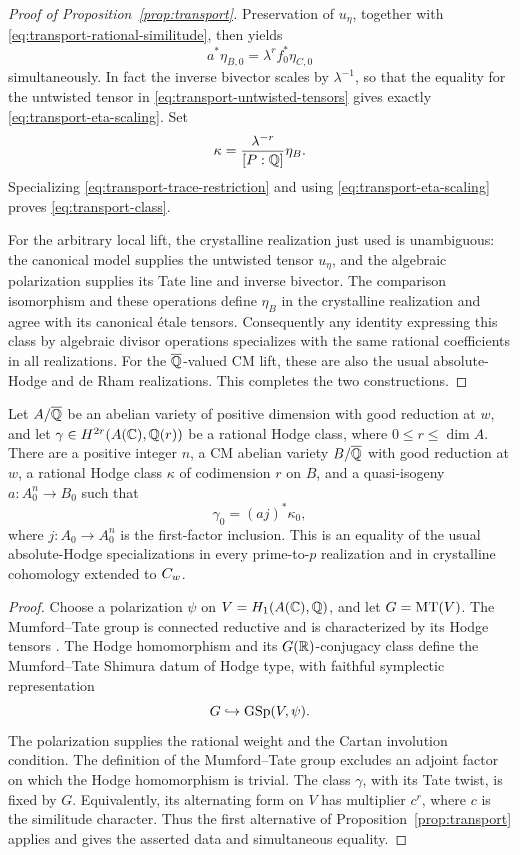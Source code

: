 \begin{proof}[Proof of Proposition~\ref{prop:transport}]
Preservation of $u_\eta$, together with
\eqref{eq:transport-rational-similitude}, then yields
\begin{equation}
 a^*\eta_{B,0}=\lambda^r f_0^*\eta_{C,0}
 \label{eq:transport-eta-scaling}
\end{equation}
simultaneously.  In fact the inverse bivector scales by
$\lambda^{-1}$, so that the equality for the untwisted tensor
in \eqref{eq:transport-untwisted-tensors} gives exactly
\eqref{eq:transport-eta-scaling}.  Set
\[
 \kappa=\frac{\lambda^{-r}}{[P:\mathbb Q]}\eta_B.
\]
Specializing \eqref{eq:transport-trace-restriction} and using
\eqref{eq:transport-eta-scaling} proves
\eqref{eq:transport-class}.

For the arbitrary local lift, the crystalline realization just
used is unambiguous: the canonical model supplies the untwisted
tensor $u_\eta$, and the algebraic polarization supplies its Tate
line and inverse bivector.  The comparison isomorphism and these
operations define $\eta_B$ in the crystalline realization and
agree with its canonical \'{e}tale tensors.  Consequently any
identity expressing this class by algebraic divisor operations
specializes with the same rational coefficients in all
realizations.  For the $\overline{\mathbb Q}$-valued CM lift, these are also the
usual absolute-Hodge and de Rham realizations.  This completes
the two constructions.
\end{proof}

\begin{corollary}
\label{cor:cm-transport}
Let \(A/\overline{\mathbb Q}\) be an abelian variety of positive dimension with
good reduction at \(w\), and let
\(\gamma\in H^{2r}(A(\mathbb C),\mathbb Q(r))\) be a rational Hodge class,
where \(0\leq r\leq\dim A\). There are a positive integer \(n\),
a CM abelian variety \(B/\overline{\mathbb Q}\) with good reduction at \(w\),
a rational Hodge class \(\kappa\) of codimension \(r\) on \(B\),
and a quasi-isogeny \(a:A_0^n\to B_0\) such that
\[
 \gamma_0=(aj)^*\kappa_0,
\]
where \(j:A_0\to A_0^n\) is the first-factor inclusion. This is an
equality of the usual absolute-Hodge specializations in every
prime-to-\(p\) realization and in crystalline cohomology extended
to \(C_w\).
\end{corollary}

\begin{proof}
Choose a polarization \(\psi\) on \(V=H_1(A(\mathbb C),\mathbb Q)\), and let
\(G=\operatorname{MT}(V)\). The Mumford--Tate group is connected reductive and
is characterized by its Hodge tensors
\cite[Section~3, Propositions~3.4 and~3.6]{Deligne1982}.
The Hodge homomorphism and its \(G(\mathbb R)\)-conjugacy class define
the Mumford--Tate Shimura datum of Hodge type, with faithful
symplectic representation
\[
 G\hookrightarrow\operatorname{GSp}(V,\psi).
\]
The polarization supplies the rational weight and the Cartan
involution condition. The definition of the Mumford--Tate group
excludes an adjoint factor on which the Hodge homomorphism is
trivial. The class \(\gamma\), with its Tate twist, is fixed by
\(G\). Equivalently, its alternating form on \(V\) has multiplier
\(c^r\), where \(c\) is the similitude character. Thus the first
alternative of Proposition~\ref{prop:transport} applies and gives
the asserted data and simultaneous equality.
\end{proof}
